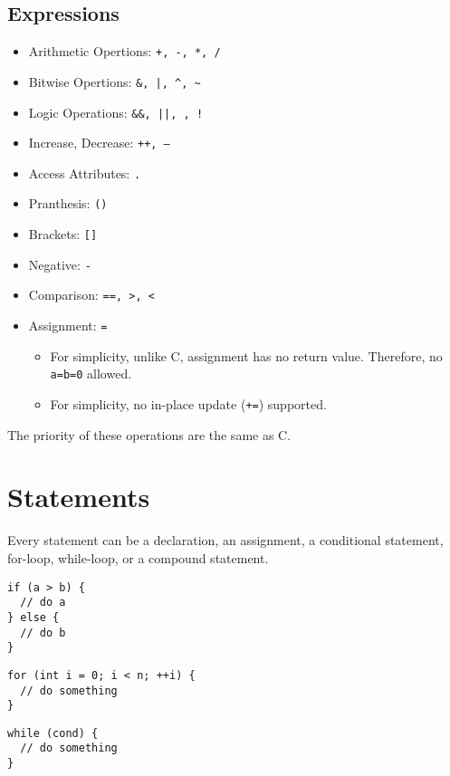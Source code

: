 \documentclass{article}
\begin{document}
\subsection{Expressions}

\begin{itemize}
  \item Arithmetic Opertions: \texttt{+, -, *, /}
  \item Bitwise Opertions: \verb|&, |\texttt{|, }\verb|^, ~|
  \item Logic Operations: \verb|&&, |\texttt{||, }\verb|, !|
  \item Increase, Decrease: \texttt{++, --}
  \item Access Attributes: \texttt{.}
  \item Pranthesis: \texttt{()}
  \item Brackets: \texttt{[]}
  \item Negative: \texttt{-}
  \item Comparison: \verb|==, >, <|
  \item Assignment: \texttt{=}
    \begin{itemize}
      \item For simplicity, unlike C, assignment has no return value.
	Therefore, no \texttt{a=b=0} allowed.
      \item For simplicity, no in-place update (\texttt{+=}) supported.
    \end{itemize}
\end{itemize}

The priority of these operations are the same as C.

\section{Statements}

Every statement can be a declaration, an assignment,
a conditional statement, for-loop,
while-loop, or a compound statement.

\begin{lstlisting}[caption=Conditional statement]
if (a > b) {
  // do a
} else {
  // do b
}
\end{lstlisting}

\begin{lstlisting}[caption=For loop]
for (int i = 0; i < n; ++i) {
  // do something
}
\end{lstlisting}

\begin{lstlisting}[caption=While loop]
while (cond) {
  // do something
}
\end{lstlisting}
\end{document}

